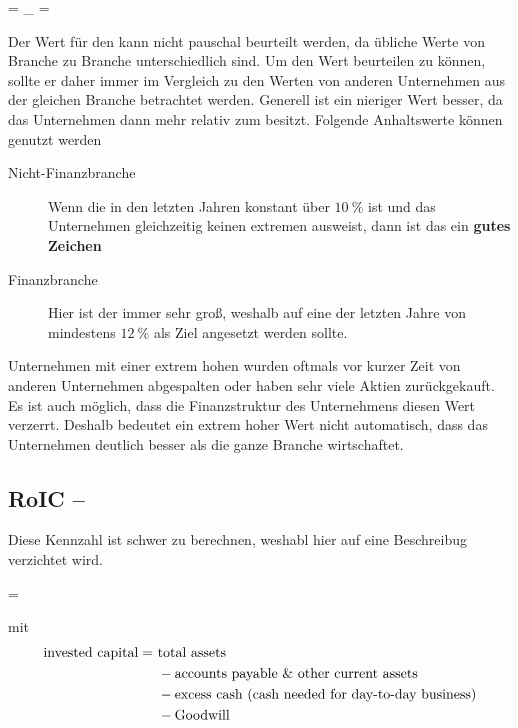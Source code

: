 \begin{formel}
     =  \cdot {}_{} = 
\end{formel}
Der Wert für den \financialLeverage kann nicht pauschal beurteilt werden, da übliche Werte von Branche zu Branche unterschiedlich sind. 
Um den Wert beurteilen zu können, sollte er daher immer im Vergleich zu den Werten von anderen Unternehmen aus der gleichen Branche betrachtet werden.
Generell ist ein nieriger Wert besser, da das Unternehmen dann mehr \shareholdersEquity relativ zum \assets besitzt.
Folgende Anhaltswerte können genutzt werden
\begin{description}
    \item[Nicht-Finanzbranche] Wenn die \returnOnEquity in den letzten Jahren konstant über $\SI{10}{\percent}$ ist und das Unternehmen gleichzeitig keinen extremen \financialLeverage ausweist, dann ist das ein \textbf{gutes Zeichen}
    \item[Finanzbranche] Hier ist der \financialLeverage immer sehr groß, weshalb auf eine \returnOnEquity der letzten Jahre von mindestens $\SI{12}{\percent}$ als Ziel angesetzt werden sollte.
\end{description}
Unternehmen mit einer extrem hohen \returnOnEquity wurden oftmals vor kurzer Zeit von anderen Unternehmen abgespalten oder haben sehr viele Aktien zurückgekauft. 
Es ist auch möglich, dass die Finanzstruktur des Unternehmens diesen Wert verzerrt.
Deshalb bedeutet ein extrem hoher Wert nicht automatisch, dass das Unternehmen deutlich besser als die ganze Branche wirtschaftet. 

%
\subsection{RoIC -- }

Diese Kennzahl ist schwer zu berechnen, weshabl hier auf eine Beschreibug verzichtet wird.
\begin{formel}
     = 
\end{formel}
mit
\begin{align}
    \begin{split}
        \text{invested capital} =\ &\text{total assets}\\ &- \text{accounts payable \& other current assets} \\ &- \text{excess cash (cash needed for day-to-day business)}\\ &- \text{Goodwill}
    \end{split}
\end{align}


